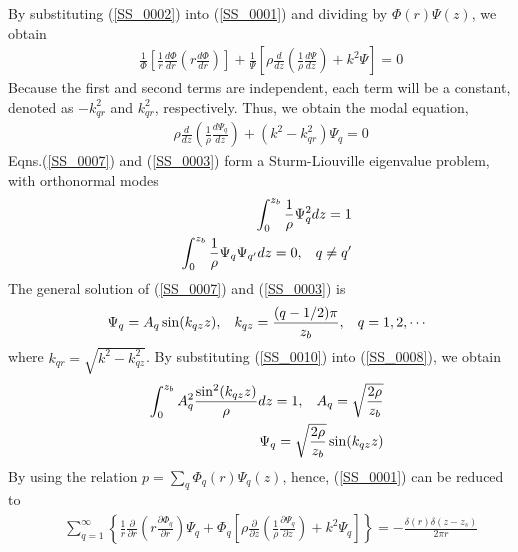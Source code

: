 \documentclass[journal,onecolumn]{IEEEtran}
\begin{document}
By substituting (\ref{SS_0002}) into (\ref{SS_0001}) and dividing by $\Phi(r) \Psi(z)$, we obtain 
\begin{eqnarray}
&&\frac{1}{\Phi} \left[ \frac{1}{r} \frac{d \Phi}{d r} \left( r \frac{d \Phi}{d r} \right) \right]
+ \frac{1}{\Psi} \left[ \rho \frac{d}{d z} \left( \frac{1}{\rho} \frac{d \Psi}{d z} \right) + k^2 \Psi \right] = 0
\label{SS_0005}
\end{eqnarray}
Because the first and second terms are independent, each term will be a constant, denoted as $- k_{qr}^2$ and $k_{qr}^2$, respectively.
Thus, we obtain the modal equation,
\begin{eqnarray}
&&\rho \frac{d}{d z} \left( \frac{1}{\rho} \frac{d \Psi_q}{d z} \right) + (k^2 - k_{qr}^2) \Psi_q = 0
\label{SS_0007}
\end{eqnarray}
Eqns.(\ref{SS_0007}) and (\ref{SS_0003}) form a Sturm-Liouville eigenvalue problem, with orthonormal modes
\begin{eqnarray}
&&\int^{z_b}_0 \frac{1}{\rho} \Psi_q^2 dz = 1 
\label{SS_0008} \\ 
&&\int^{z_b}_0 \frac{1}{\rho} \Psi_q \Psi_{q'} dz = 0, \hspace{0.3cm} q \neq q'
\label{SS_0009} 
\end{eqnarray}
The general solution of (\ref{SS_0007}) and (\ref{SS_0003}) is
\begin{eqnarray}
&&\Psi_q = A_q \sin(k_{qz} z), \hspace{0.3 cm} k_{qz} = \frac{(q - 1/2) \pi}{z_b}, \hspace{0.3 cm} q = 1, 2, \cdots
\label{SS_0010}
\end{eqnarray}
where $k_{qr} = \sqrt{k^2 - k_{qz}^2}$.
By substituting (\ref{SS_0010}) into (\ref{SS_0008}), we obtain
\begin{eqnarray}
&&\int^{z_b}_0 A_q^2 \frac{\sin^2 (k_{qz} z)}{\rho} dz = 1, \hspace{0.3 cm} A_q = \sqrt{\frac{2 \rho}{z_b}}
\label{SS_0012} \\
&&\Psi_q = \sqrt{\frac{2 \rho}{z_b}} \sin (k_{qz} z)
\label{SS_0013}
\end{eqnarray}
By using the relation $p = \sum_q \Phi_q(r) \Psi_q(z)$, hence, (\ref{SS_0001}) can be reduced to
\begin{eqnarray}
&&\sum_{q = 1}^{\infty} \left\{ \frac{1}{r} \frac{\partial}{\partial r} \left(r \frac{\partial \Phi_q}{\partial r} \right) \Psi_q 
+ \Phi_q \left[ \rho \frac{\partial}{\partial z} \left( \frac{1}{\rho} \frac{\partial \Psi_q}{\partial z} \right) + k^2 \Psi_q \right] 
\right\} = - \frac{\delta (r) \delta(z - z_s)}{2 \pi r}
\label{SS_0014} 
\end{eqnarray}
\end{document}
